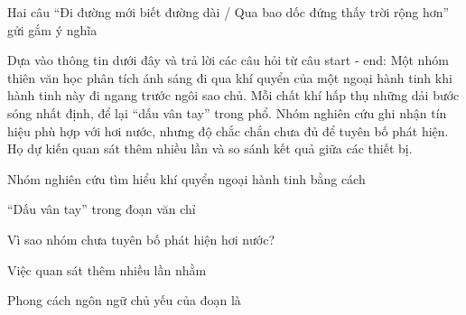 \begin{ex}
Hai câu “Đi đường mới biết đường dài / Qua bao dốc đứng thấy trời rộng hơn” gửi gắm ý nghĩa
\end{ex}

\begin{baidoc}
\item[] Dựa vào thông tin dưới đây và trả lời các câu hỏi từ câu {start} - {end}:
Một nhóm thiên văn học phân tích ánh sáng đi qua khí quyển của một ngoại hành tinh khi hành tinh này đi ngang trước ngôi sao chủ. Mỗi chất khí hấp thụ những dải bước sóng nhất định, để lại “dấu vân tay” trong phổ. Nhóm nghiên cứu ghi nhận tín hiệu phù hợp với hơi nước, nhưng độ chắc chắn chưa đủ để tuyên bố phát hiện. Họ dự kiến quan sát thêm nhiều lần và so sánh kết quả giữa các thiết bị.

\begin{ex}
Nhóm nghiên cứu tìm hiểu khí quyển ngoại hành tinh bằng cách
\end{ex}

\begin{ex}
“Dấu vân tay” trong đoạn văn chỉ
\end{ex}

\begin{ex}
Vì sao nhóm chưa tuyên bố phát hiện hơi nước?
\end{ex}

\begin{ex}
Việc quan sát thêm nhiều lần nhằm
\end{ex}

\begin{ex}
Phong cách ngôn ngữ chủ yếu của đoạn là
\end{ex}
\end{baidoc}

